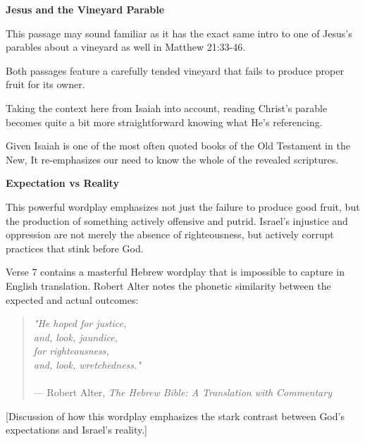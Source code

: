 \documentclass[11pt]{article}
\begin{document}
\vspace{3em}
{\large\bfseries Jesus and the Vineyard Parable}
\vspace{1em}

This passage may sound familiar as it has the exact same intro to one of Jesus's parables about a vineyard as well in Matthew 21:33-46.

Both passages feature a carefully tended vineyard that fails to produce proper fruit for its owner.

\vspace{1em}

Taking the context here from Isaiah into account, reading Christ's parable becomes quite a bit more straightforward knowing what He's referencing.

Given Isaiah is one of the most often quoted books of the Old Testament in the New, It re-emphasizes our need to know the whole of the revealed scriptures. 

\vspace{3em}
{\large\bfseries Expectation vs Reality}
\vspace{1em}


This powerful wordplay emphasizes not just the failure to produce good fruit, but the production of something actively offensive and putrid. Israel's injustice and oppression are not merely the absence of righteousness, but actively corrupt practices that stink before God.

\vspace{1em}

Verse 7 contains a masterful Hebrew wordplay that is impossible to capture in English translation. Robert Alter notes the phonetic similarity between the expected and actual outcomes:

\begin{quote}
\textit{"He hoped for justice,\\ and, look, jaundice,\\ for righteousness,\\ and, look, wretchedness."}\\\\
\hfill --- Robert Alter, \textit{The Hebrew Bible: A Translation with Commentary}
\end{quote}

\vspace{1em}

[Discussion of how this wordplay emphasizes the stark contrast between God's expectations and Israel's reality.]
\end{document}

